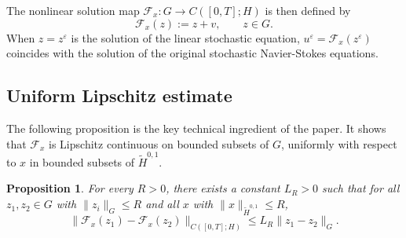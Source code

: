\documentclass[11pt,a4paper,reqno]{amsart}
\newtheorem{proposition}[theorem]{Proposition}
\theoremstyle{definition}
\begin{document}
The nonlinear solution map $\mathcal F_x : G \to C([0,T];H)$ is then defined by
\[
\mathcal F_x(z) := z + v, \qquad z\in G .
\]
When $z=z^\varepsilon$ is the solution of the linear stochastic equation,
$u^\varepsilon = \mathcal F_x(z^\varepsilon)$ coincides with the solution of
the original stochastic Navier-Stokes equations.

\subsection{Uniform Lipschitz estimate}
\label{sec:lipschitz}

The following proposition is the key technical ingredient of the paper.
It shows that $\mathcal F_x$ is Lipschitz continuous on bounded subsets of $G$,
uniformly with respect to $x$ in bounded subsets of $\widetilde H^{0,1}$.

\begin{proposition}\label{prop:Lip}
  For every $R>0$, there exists a constant $L_R>0$ such that for all
  $z_1,z_2\in G$ with $\|z_i\|_G\le R$ and all $x$ with $\|x\|_{\widetilde H^{0,1}}\le R$,
  \[
    \|\mathcal F_x(z_1) - \mathcal F_x(z_2)\|_{C([0,T];H)} \le L_R \|z_1-z_2\|_G .
  \]
\end{proposition}
\end{document}
